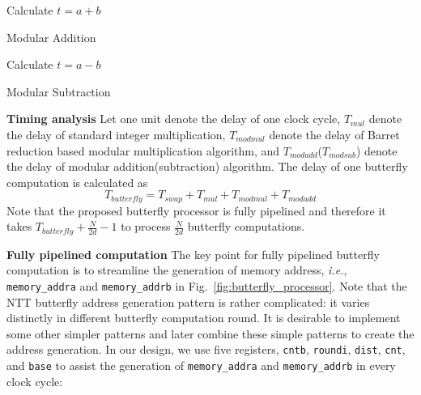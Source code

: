 \documentclass{iacrtrans}
\theoremstyle{plain}
\begin{document}
\begin{algorithm}[!tbh]
 \DontPrintSemicolon %
    Calculate $t=a+b$\;
     
    
 \caption{Modular Addition}\label{alg:modadd}
\end{algorithm}

\begin{algorithm}[!tbh]
 \DontPrintSemicolon %
    Calculate $t=a-b$\;
     
    
 \caption{Modular Subtraction}\label{alg:modsub}
\end{algorithm}

\textbf{Timing analysis} Let  one unit denote the delay of one clock cycle, $T_{mul}$ denote the delay of standard integer multiplication, $T_{modmul}$ denote the delay of Barret reduction based modular multiplication algorithm, and $T_{modadd}$($T_{modsub}$) denote the delay of modular addition(subtraction) algorithm. The delay of one butterfly computation is calculated as
\[
    T_{butterfly} = T_{swap}+T_{mul}+T_{modmul}+T_{modadd}
\]
Note that the proposed butterfly processor is fully pipelined and therefore it takes $T_{butterfly}+\frac{N}{2d}-1$ to process $\frac{N}{2d}$ butterfly computations.

\textbf{Fully pipelined computation} The key point for fully pipelined butterfly computation is to streamline the generation of memory address, \textit{i.e.}, \texttt{memory\_addra} and \texttt{memory\_addrb} in Fig.~\ref{fig:butterfly_processor}. Note that the NTT butterfly address generation pattern is rather complicated: it varies distinctly in different butterfly computation round. It is desirable to implement some other simpler patterns and later combine these simple patterns to create the address generation.  In our design, we use five registers, \texttt{cntb}, \texttt{roundi}, \texttt{dist}, \texttt{cnt}, and \texttt{base} to assist the generation of \texttt{memory\_addra} and \texttt{memory\_addrb} in every clock cycle:
\end{document}
